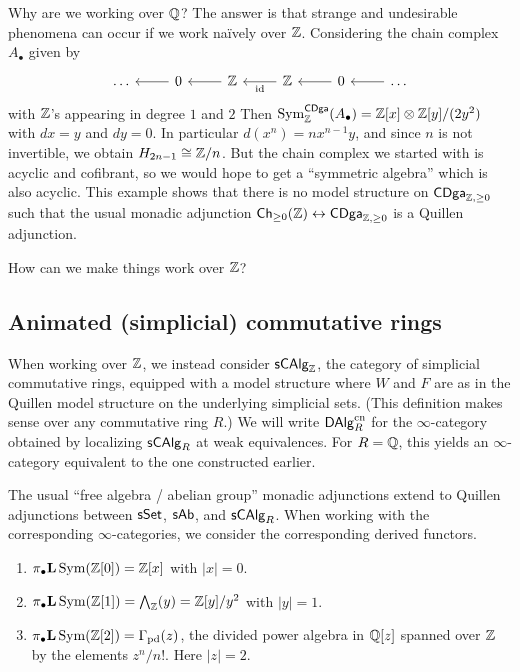 \documentclass{amsart}
\begin{document}
\begin{ex}
	Why are we working over $\mathbb{Q}$?
	The answer is that strange and undesirable phenomena can occur if we work na\"ively over $\mathbb{Z}$.
	Considering the chain complex $A_\bullet$ given by
	\[
		\begin{tikzcd}
			\dots & 0 \lar & \ZZ \lar & \ZZ \lar["\id"] & 0 \lar & \dots \lar
		\end{tikzcd}
	\]
	with $\mathbb{Z}$'s appearing in degree $1$ and $2$
	Then $\operatorname{Sym}_{\mathbb{Z}}^{\mathsf{CDga}}(A_\bullet) = \mathbb{Z}[x] \otimes \mathbb{Z}[y] / (2y^2)$ with $dx = y$ and $dy = 0$.
	In particular $d(x^n) = n x^{n-1} y$, and since $n$ is not invertible, we obtain $H_{2n-1} \cong \mathbb{Z} / n$.
	But the chain complex we started with is acyclic and cofibrant, so we would hope to get a ``symmetric algebra'' which is also acyclic.
	This example shows that there is no model structure on $\mathsf{CDga}_{\mathbb{Z}, \geq 0}$ such that the usual monadic adjunction $\mathsf{Ch}_{\geq 0}(\mathbb{Z}) \leftrightarrow \mathsf{CDga}_{\mathbb{Z}, \geq 0}$ is a Quillen adjunction.
\end{ex}

How can we make things work over $\mathbb{Z}$?

\subsection{Animated (simplicial) commutative rings}

When working over $\mathbb{Z}$, we instead consider $\mathsf{s}\mathsf{CAlg}_{\mathbb{Z}}$, the category of simplicial commutative rings, equipped with a model structure where $W$ and $F$ are as in the Quillen model structure on the underlying simplicial sets.
(This definition makes sense over any commutative ring $R$.)
We will write $\mathsf{DAlg}_R^{\mathrm{cn}}$ for the $\infty$-category obtained by localizing $\mathsf{s}\mathsf{CAlg}_R$ at weak equivalences.
For $R = \mathbb{Q}$, this yields an $\infty$-category equivalent to the one constructed earlier.

The usual ``free algebra / abelian group'' monadic adjunctions extend to Quillen adjunctions between $\mathsf{sSet}$, $\mathsf{s}\mathsf{Ab}$, and $\mathsf{s}\mathsf{CAlg}_R$.
When working with the corresponding $\infty$-categories, we consider the corresponding derived functors.

\begin{ex}
	\begin{enumerate}
		\item $\pi_\bullet \mathbf{L} \operatorname{Sym} (\mathbb{Z}[0]) = \mathbb{Z}[x]$ with $|x| = 0$.
		\item $\pi_\bullet \mathbf{L} \operatorname{Sym} (\mathbb{Z}[1]) = \bigwedge_{\mathbb{Z}}(y) = \mathbb{Z}[y] / y^2$ with $|y| = 1$.
		\item $\pi_\bullet \mathbf{L} \operatorname{Sym} (\mathbb{Z}[2]) = \Gamma_{\mathrm{pd}}(z)$, the divided power algebra in $\mathbb{Q}[z]$ spanned over $\mathbb{Z}$ by the elements $z^n / n!$.
			Here $|z| = 2$.
	\end{enumerate}
\end{ex}
\end{document}

